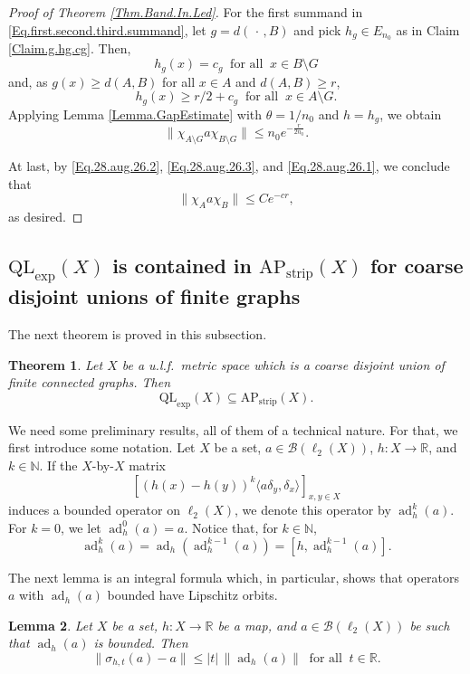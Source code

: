 \documentclass[11pt]{amsart}
\newcommand{\R}{\mathbb{R}}
\newcommand{\N}{\mathbb{N}}
\newcommand{\cB}{\mathcal{B}}
\newcommand{\AP}{\mathrm{AP}}
\numberwithin{equation}{section}
\newtheorem{theorem}{Theorem}[section]
\newtheorem{lemma}[theorem]{Lemma}
\theoremstyle{definition}
\theoremstyle{remark}
\DeclareMathOperator{\ad}{ad}
\begin{document}
\begin{proof}[Proof of Theorem \ref{Thm.Band.In.Led}]
For the first summand in \eqref{Eq.first.second.third.summand}, let $g=d(\,\cdot\,,B)$ and  pick  $h_g\in E_{n_0}$ as in Claim \ref{Claim.g.hg.cg}. Then,
\[h_g(x)=c_g\ \text{ for all }\ x\in B\setminus G\] and, as $g(x)\geq d(A,B)$ for all $x\in A$ and $d(A,B)\geq r$,   \[h_g(x)\geq r/2+c_g\ \text{ for all }\ x\in A\setminus G.\]
Applying  Lemma \ref{Lemma.GapEstimate}  with $\theta=1/n_0$ and $h=h_g$,    we obtain
\begin{equation}\label{Eq.28.aug.26.1}\|\chi_{A\setminus G} a\chi_{B\setminus G}\|\leq n_0e^{-\frac{r}{2n_0}}.\end{equation}

At last, by  \eqref{Eq.28.aug.26.2},   \eqref{Eq.28.aug.26.3}, and \eqref{Eq.28.aug.26.1}, we conclude that \[\|\chi_Aa\chi_B\|\leq Ce^{-cr},\] as desired.
\end{proof}


\subsection{$\mathrm{QL}_{\exp}(X)$ is  contained in  $\mathrm{AP}_{\mathrm{strip}}(X)$ for coarse disjoint unions of finite graphs}
 The next theorem is proved in this subsection.

\begin{theorem}\label{Thm.Led.In.Band}
Let $X$ be a u.l.f.\ metric space which is a coarse disjoint union of   finite connected graphs. Then
\[\mathrm{QL}_{\exp}(X)\subseteq \AP_{\mathrm{strip}}(X).\]
\end{theorem}

We need some preliminary results, all of them of a technical nature. For that, we first introduce some notation.  Let $X$ be a set, $a\in \cB(\ell_2(X))$, $h\colon X\to \R$, and $k\in  \N$. If the $X$-by-$X$ matrix
\[\left[(h(x)-h(y))^k\langle a\delta_y,\delta_x\rangle\right]_{x,y\in X}\]
induces a bounded operator on $\ell_2(X)$, we denote this operator by $\ad_h^k(a)$.
For $k=0$, we   let   $\ad^0_h(a)=a$. Notice that, for 
$k\in \N$, 
\begin{equation}\label{Eq.defi.adk.inductive}
\ad^k_h(a)=\ad_h\left(\ad^{k-1}_h(a)\right)=\left[h,\ad^{k-1}_h(a)\right].
\end{equation}

The next lemma is an integral formula which, in particular, shows that operators $a$ with $\ad_h(a)$ bounded have Lipschitz orbits.

\begin{lemma}\label{Lemma.Duhamel}
Let $X$ be a set,  $h\colon X\to\R$ be a map, and  $a\in\cB(\ell_2(X))$ be such that $\ad_h(a)$ is bounded. Then
\[\|\sigma_{h,t}(a)-a\|\leq |t|\,\|\ad_h(a)\|\ \text{ for all }\ t\in\R.\]
\end{lemma}
\end{document}
